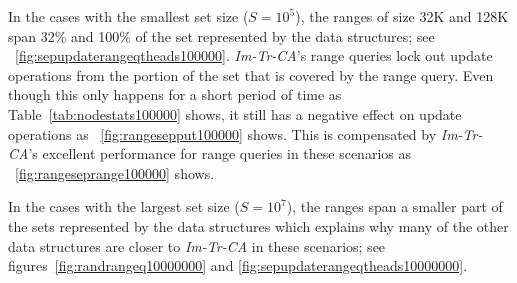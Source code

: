 \documentclass[a4paper,UKenglish]{oasics}
\begin{document}
In the cases with the smallest set size ($S=10^5$), the ranges of size 32K and 128K span 32\% and 100\% of the set represented by the data structures; see \figurename~\ref{fig:sepupdaterangeqtheads100000}.
\emph{Im-Tr-CA}'s range queries lock out update operations from the portion of the set that is covered by the range query.
Even though this only happens for a short period of time as Table~\ref{tab:nodestats100000} shows, it still has a negative effect on update operations as \figurename~\ref{fig:rangesepput100000} shows.
This is compensated by \emph{Im-Tr-CA}'s excellent performance for range queries in these scenarios as \figurename~\ref{fig:rangeseprange100000} shows.

In the cases with the largest set size ($S=10^7$), the ranges span a smaller part of the sets represented by the data structures which explains why many of the other data structures are closer to \emph{Im-Tr-CA} in these scenarios; see figures~\ref{fig:randrangeq10000000} and \ref{fig:sepupdaterangeqtheads10000000}.


%


\end{document}
